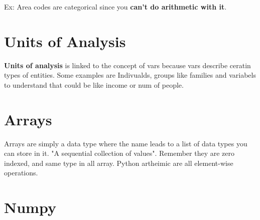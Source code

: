 \documentclass[11pt]{article}
\begin{document}
Ex: Area codes are categorical since you \textbf{can't do arithmetic with it}. 
\newline

\section{Units of Analysis}
\textbf{Units of analysis} is linked to the concept of vars because vars describe ceratin types of entities. Some examples are Indivualds, groups like families and variabels to understand that could be like income or num of people.

\section{Arrays}
Arrays are simply a data type where the name leads to a list of data types you can store in it. "A sequential collection of values".
Remember they are zero indexed, and same type in all array. Python artheimic are all element-wise operations.

\section{Numpy}





\end{document}
